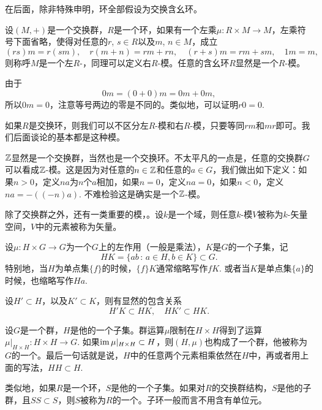 在后面，除非特殊申明，环全部假设为交换含幺环。

\begin{para}
设$(M,+)$是一个交换群，$R$是一个环，如果有一个左乘$\mu:R\times M\to M$，左乘符号下面省略，使得对任意的$r$, $s\in R$以及$m$, $n\in M$，成立
\[
	(rs)m=r(sm),\quad r(m+n)=rm+rn,\quad (r+s)m=rm+sm,\quad 1m=m,
\]
则称呼$M$是一个左$R$-，同理可以定义右$R$-模。任意的含幺环$R$显然是一个$R$-模。
\end{para}

由于
\[
	0m=(0+0)m=0m+0m,
\]
所以$0m=0$，注意等号两边的零是不同的。类似地，可以证明$r0=0$. 

如果$R$是交换环，则我们可以不区分左$R$-模和右$R$-模，只要等同$rm$和$mr$即可。我们后面谈论的基本都是这种模。

\para $\mathbb{Z}$显然是一个交换群，当然也是一个交换环。不太平凡的一点是，任意的交换群$G$可以看成$\mathbb{Z}$-模。这是因为对任意的$n\in \mathbb{Z}$和任意的$a\in G$，我们做出如下定义：如果$n>0$，定义$na$为$n$个$a$相加，如果$n=0$，定义$na=0$，如果$n<0$，定义$na=-((-n)a)$. 不难检验这是确实是一个$\mathbb{Z}$-模。

除了交换群之外，还有一类重要的模，。设$k$是一个域，则任意$k$-模$V$被称为$k$-矢量空间，$V$中的元素被称为矢量。

\begin{para}
设$\mu:H\times G\to G$为一个$G$上的左作用（一般是乘法），$K$是$G$的一个子集，记
\[
	HK=\{ab\,:\,a\in H,b\in K\}\subset G.
\]
特别地，当$H$为单点集$\{f\}$的时候，$\{f\}K$通常缩略写作$fK$. 或者当$K$是单点集$\{a\}$的时候，也缩略写作$Ha$.
\end{para}

设$H'\subset H$，以及$K'\subset K$，则有显然的包含关系
\[
	H'K\subset HK,\quad HK'\subset HK.
\]


\para 设$G$是一个群，$H$是他的一个子集。群运算$\mu$限制在$H\times H$得到了运算$\mu|_{H\times H}:H\times H\to G$. 如果$\operatorname{im}\mu|_{H\times H}\subset H$，则$(H,\mu)$也构成了一个群，他被称为$G$的一个。最后一句话就是说，$H$中的任意两个元素相乘依然在$H$中，再或者用上面的写法，$HH\subset H$.

类似地，如果$R$是一个环，$S$是他的一个子集。如果对$R$的交换群结构，$S$是他的子群，且$SS\subset S$，则$S$被称为$R$的一个。子环一般而言不用含有单位元。

